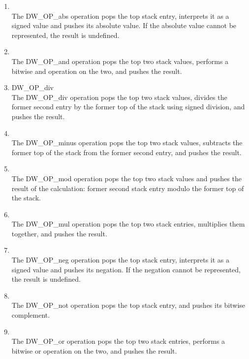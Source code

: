 \begin{enumerate}[1]
\item {}  \\
The DW\_OP\_abs operation pops the top stack entry, interprets
it as a signed value and pushes its absolute value. If the
absolute value cannot be represented, the result is undefined.

\item {} \\
The DW\_OP\_and operation pops the top two stack values, performs
a bitwise and operation on the two, and pushes the result.

\item \label{chap:DWOPdiv}{DW\_OP\_div} \\
The DW\_OP\_div operation pops the top two stack values, divides the former second entry by
the former top of the stack using signed division, and pushes the result.

\item {} \\
The DW\_OP\_minus operation pops the top two stack values, subtracts the former top of the
stack from the former second entry, and pushes the result.

\item {}\\
The DW\_OP\_mod operation pops the top two stack values and pushes the result of the
calculation: former second stack entry modulo the former top of the stack.

\item {} \\
The DW\_OP\_mul operation pops the top two stack entries, multiplies them together, and
pushes the result.

\item  {} \\
The DW\_OP\_neg operation pops the top stack entry, interprets
it as a signed value and pushes its negation. If the negation
cannot be represented, the result is undefined.

\item  {} \\
The DW\_OP\_not operation pops the top stack entry, and pushes
its bitwise complement.

\item  {} \\
The DW\_OP\_or operation pops the top two stack entries, performs
a bitwise or operation on the two, and pushes the result.


\end{enumerate}

